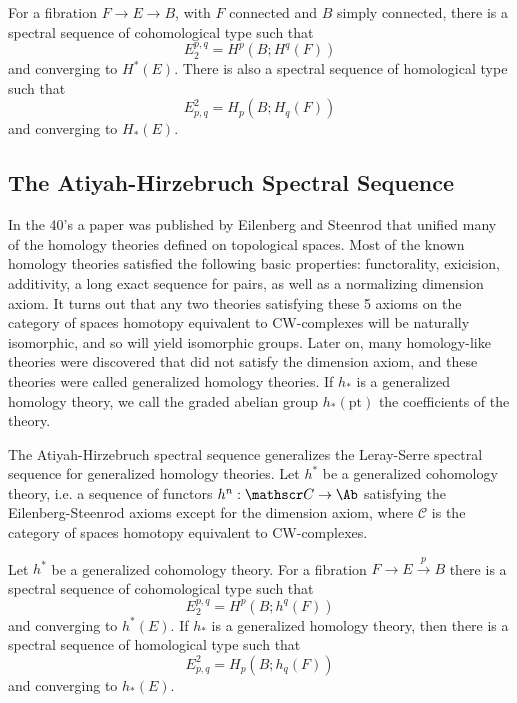 \begin{thm}
For a fibration $F \rightarrow E \rightarrow B$, with $F$ connected and $B$ simply connected, there is a spectral sequence of cohomological type such that
\[ E_2^{p,q} = H^p(B; H^q(F)) \]
and converging to $H^*(E)$. There is also a spectral sequence of homological type such that
\[ E^2_{p,q} = H_p(B; H_q(F)) \]
and converging to $H_*(E)$.
\end{thm}





\subsection{The Atiyah-Hirzebruch Spectral Sequence}

In the 40's a paper was published by Eilenberg and Steenrod that unified many of the homology theories defined on topological spaces. Most of the known homology theories satisfied the following basic properties: functorality, exicision, additivity, a long exact sequence for pairs, as well as a normalizing dimension axiom. It turns out that any two theories satisfying these 5 axioms on the category of spaces homotopy equivalent to CW-complexes will be naturally isomorphic, and so will yield isomorphic groups. Later on, many homology-like theories were discovered that did not satisfy the dimension axiom, and these theories were called generalized homology theories. If $h_*$ is a generalized homology theory, we call the graded abelian group $h_*(\text{pt})$ the coefficients of the theory.

The Atiyah-Hirzebruch spectral sequence generalizes the Leray-Serre spectral sequence for generalized homology theories. Let $h^*$ be a generalized cohomology theory, i.e. a sequence of functors $h^n : \mathscr C \rightarrow \Ab$ satisfying the Eilenberg-Steenrod axioms except for the dimension axiom, where $\mathscr C$ is the category of spaces homotopy equivalent to CW-complexes. 

\begin{thm}
Let $h^*$ be a generalized cohomology theory. For a fibration $F \rightarrow E \stackrel{p}{\rightarrow} B$ there is a spectral sequence of cohomological type such that
\[ E_2^{p,q} = H^p(B; h^q(F)) \]
and converging to $h^*(E)$. If $h_*$ is a generalized homology theory, then there is a spectral sequence of homological type such that
\[ E^2_{p,q} = H_p(B; h_q(F)) \]
and converging to $h_*(E)$.
\end{thm}


